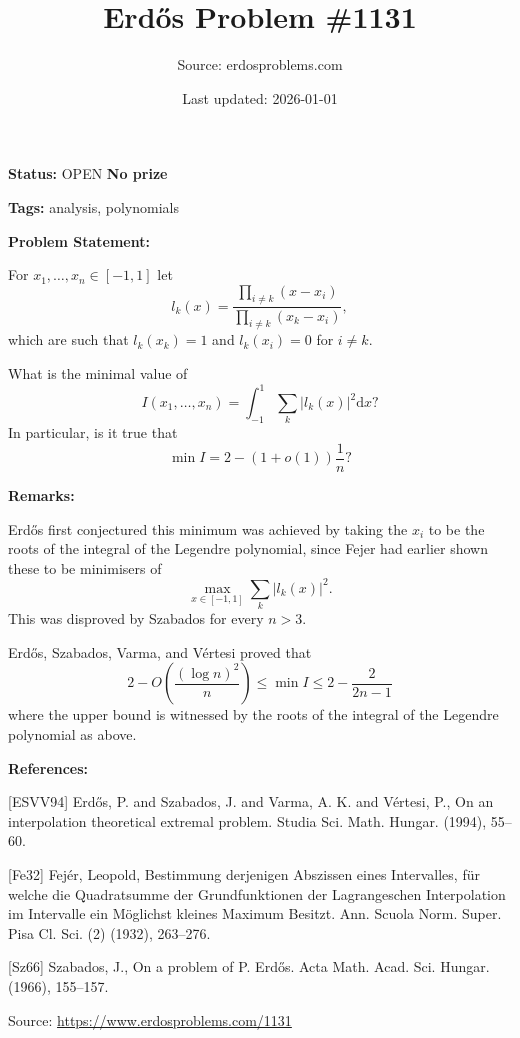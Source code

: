 \documentclass{article}
\title{Erd\H{o}s Problem \#1131}
\date{Last updated: 2026-01-01}
\author{Source: erdosproblems.com}
\begin{document}
\maketitle

\noindent\textbf{Status:} OPEN \quad \textbf{No prize}

\noindent\textbf{Tags:} analysis, polynomials

\medskip
\noindent\textbf{Problem Statement:}

For $x_1,\ldots,x_n\in [-1,1]$ let\[l_k(x)=\frac{\prod_{i\neq k}(x-x_i)}{\prod_{i\neq k}(x_k-x_i)},\]which are such that $l_k(x_k)=1$ and $l_k(x_i)=0$ for $i\neq k$.

What is the minimal value of\[I(x_1,\ldots,x_n)=\int_{-1}^1 \sum_k \lvert l_k(x)\rvert^2\mathrm{d}x?\]In particular, is it true that\[\min I =2-(1+o(1))\frac{1}{n}?\]

\bigskip
\noindent\textbf{Remarks:}

Erd\H{o}s first conjectured this minimum was achieved by taking the $x_i$ to be the roots of the integral of the Legendre polynomial, since Fejer \cite{Fe32} had earlier shown these to be minimisers of\[\max_{x\in [-1,1]}\sum_k \lvert l_k(x)\rvert^2.\]This was disproved by Szabados \cite{Sz66} for every $n>3$. 

Erd\H{o}s, Szabados, Varma, and V\'{e}rtesi \cite{ESVV94} proved that\[2-O\left(\frac{(\log n)^2}{n}\right)\leq \min I\leq 2-\frac{2}{2n-1}\]where the upper bound is witnessed by the roots of the integral of the Legendre polynomial as above.

\bigskip
\noindent\textbf{References:}

[ESVV94] Erd\H{o}s, P. and Szabados, J. and Varma, A. K. and V\'{e}rtesi,
P., On an interpolation theoretical extremal problem. Studia Sci. Math. Hungar. (1994), 55--60.
 
 [Fe32] Fej\'{e}r, Leopold, Bestimmung derjenigen {A}bszissen eines Intervalles, f\"ur
welche die {Q}uadratsumme der {G}rundfunktionen der
{L}agrangeschen Interpolation im Intervalle ein
{M}\"oglichst kleines {M}aximum {B}esitzt. Ann. Scuola Norm. Super. Pisa Cl. Sci. (2) (1932), 263--276.
 
 [Sz66] Szabados, J., On a problem of {P}. {E}rd\H{o}s. Acta Math. Acad. Sci. Hungar. (1966), 155--157.

\bigskip
\noindent\small{Source: \url{https://www.erdosproblems.com/1131}}
\end{document}

